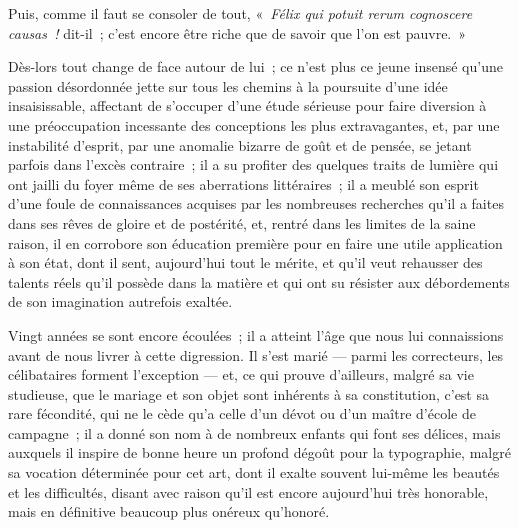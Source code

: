 \documentclass[french,twoside]{book} %
\begin{document}
\noindent Puis, comme il faut se consoler de tout, « \emph{Félix qui potuit rerum cognoscere causas !} dit-il ; c’est encore être riche que de savoir que l’on est pauvre. »\par
Dès-lors tout change de face autour de lui ; ce n’est plus ce jeune insensé qu’une passion désordonnée jette sur tous les chemins à la poursuite d’une idée insaisissable, affectant de s’occuper d’une étude sérieuse pour faire diversion à une préoccupation incessante des conceptions les plus extravagantes, et, par une instabilité d’esprit, par une anomalie bizarre de goût et de pensée, se jetant parfois dans l’excès contraire ; il a su profiter des quelques traits de lumière qui ont  jailli du foyer même de ses aberrations littéraires ; il a meublé son esprit d’une foule de connaissances acquises par les nombreuses recherches qu’il a faites dans ses rêves de gloire et de postérité, et, rentré dans les limites de la saine raison, il en corrobore son éducation première pour en faire une utile application à son état, dont il sent, aujourd’hui tout le mérite, et qu’il veut rehausser des talents réels qu’il possède dans la matière et qui ont su résister aux débordements de son imagination autrefois exaltée.\par
Vingt années se sont encore écoulées ; il a atteint l’âge que nous lui connaissions avant de nous livrer à cette digression. Il s’est marié — parmi les correcteurs, les célibataires forment l’exception — et, ce qui prouve d’ailleurs, malgré sa vie studieuse, que le mariage et son objet sont inhérents à sa constitution, c’est sa rare fécondité, qui ne le cède qu’a celle d’un  dévot ou d’un maître d’école de campagne ; il a donné son nom à de nombreux enfants qui font ses délices, mais auxquels il inspire de bonne heure un profond dégoût pour la typographie, malgré sa vocation déterminée pour cet art, dont il exalte souvent lui-même les beautés et les difficultés, disant avec raison qu’il est encore aujourd’hui très honorable, mais en définitive beaucoup plus onéreux qu’honoré.\par
\end{document}
